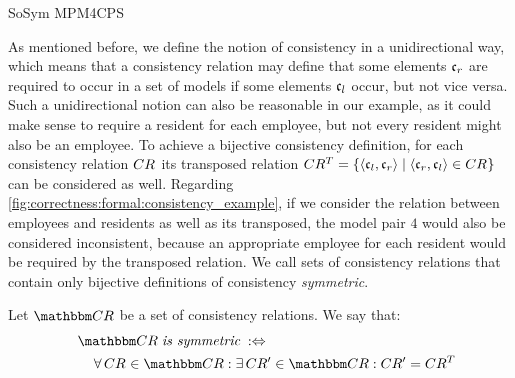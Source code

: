 \begin{copiedFrom}{SoSym MPM4CPS}

As mentioned before, we define the notion of consistency in a unidirectional way, which means that a consistency relation may define that some elements $\mathfrak{c}_{r}$ are required to occur in a set of models if some elements $\mathfrak{c}_{l}$ occur, but not vice versa.
Such a unidirectional notion can also be reasonable in our example, as it could make sense to require a resident for each employee, but not every resident might also be an employee.
To achieve a bijective consistency definition, for each consistency relation $CR_{}$ its transposed relation $CR^T_{} = \{ \langle \mathfrak{c}_{l}, \mathfrak{c}_{r} \rangle \mid \langle \mathfrak{c}_{r}, \mathfrak{c}_{l} \rangle \in CR_{} \}$ can be considered as well.
Regarding \autoref{fig:correctness:formal:consistency_example}, if we consider the relation between employees and residents as well as its transposed, the model pair $4$ would also be considered inconsistent, because an appropriate employee for each resident would be required by the transposed relation.
We call sets of consistency relations that contain only bijective definitions of consistency \emph{symmetric}.

\begin{definition}
    Let $\consistencyrelationset{CR}$ be a set of consistency relations.
    We say that:
    \begin{align*}
        \formulaskip &
        \consistencyrelationset{CR} \mathtext{is symmetric} \equivalentperdefinition \\
        & \formulaskip
        \forall \consistencyrelation{CR}{} \in \consistencyrelationset{CR} :
        \exists \consistencyrelation{CR'}{} \in \consistencyrelationset{CR} :
        \consistencyrelation{CR'}{} = \consistencyrelation{CR^T}{}
    \end{align*}
\end{definition}


\end{copiedFrom}
